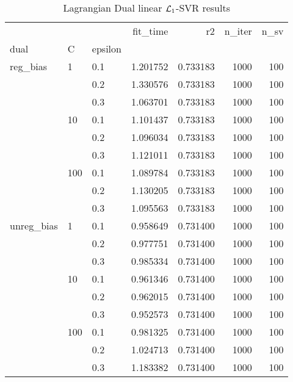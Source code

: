 \begin{table}[H]
\centering
\caption{Lagrangian Dual linear $\protect \mathcal{L}_1$-SVR results}
\label{linear_lagrangian_dual_l1_svr_cv_results}
\begin{tabular}{lllrrrr}
\toprule
           &     &     &  fit\_time &        r2 &  n\_iter &  n\_sv \\
dual & C & epsilon &           &           &         &       \\
\midrule
reg\_bias & 1   & 0.1 &  1.201752 &  0.733183 &    1000 &   100 \\
           &     & 0.2 &  1.330576 &  0.733183 &    1000 &   100 \\
           &     & 0.3 &  1.063701 &  0.733183 &    1000 &   100 \\
           & 10  & 0.1 &  1.101437 &  0.733183 &    1000 &   100 \\
           &     & 0.2 &  1.096034 &  0.733183 &    1000 &   100 \\
           &     & 0.3 &  1.121011 &  0.733183 &    1000 &   100 \\
           & 100 & 0.1 &  1.089784 &  0.733183 &    1000 &   100 \\
           &     & 0.2 &  1.130205 &  0.733183 &    1000 &   100 \\
           &     & 0.3 &  1.095563 &  0.733183 &    1000 &   100 \\
unreg\_bias & 1   & 0.1 &  0.958649 &  0.731400 &    1000 &   100 \\
           &     & 0.2 &  0.977751 &  0.731400 &    1000 &   100 \\
           &     & 0.3 &  0.985334 &  0.731400 &    1000 &   100 \\
           & 10  & 0.1 &  0.961346 &  0.731400 &    1000 &   100 \\
           &     & 0.2 &  0.962015 &  0.731400 &    1000 &   100 \\
           &     & 0.3 &  0.952573 &  0.731400 &    1000 &   100 \\
           & 100 & 0.1 &  0.981325 &  0.731400 &    1000 &   100 \\
           &     & 0.2 &  1.024713 &  0.731400 &    1000 &   100 \\
           &     & 0.3 &  1.183382 &  0.731400 &    1000 &   100 \\
\bottomrule
\end{tabular}
\end{table}
